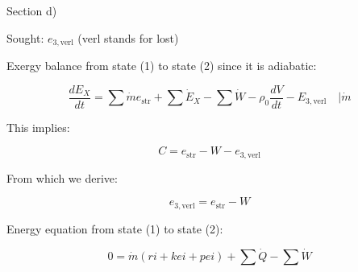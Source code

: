 Section d)

Sought: \( e_{3, \text{verl}} \) (verl stands for lost)

Exergy balance from state (1) to state (2) since it is adiabatic:

\[
\frac{dE_X}{dt} = \sum \dot{m} e_{\text{str}} + \sum \dot{E}_X - \sum \dot{W} - \rho_0 \frac{dV}{dt} - E_{3, \text{verl}} \quad \Bigg| \dot{m}
\]

This implies:

\[
C = e_{\text{str}} - W - e_{3, \text{verl}}
\]

From which we derive:

\[
e_{3, \text{verl}} = e_{\text{str}} - W
\]

Energy equation from state (1) to state (2):

\[
0 = \dot{m} (ri + kei + pei) + \sum \dot{Q} - \sum \dot{W}
\]